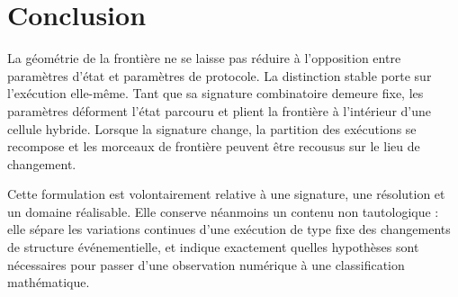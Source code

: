 \section{Conclusion}
\label{annexe-J-conclusion}

La géométrie de la frontière ne se laisse pas réduire à l'opposition
entre paramètres d'état et paramètres de protocole. La distinction
stable porte sur l'exécution elle-même. Tant que sa signature
combinatoire demeure fixe, les paramètres déforment l'état parcouru et
plient la frontière à l'intérieur d'une cellule hybride. Lorsque la
signature change, la partition des exécutions se recompose et les
morceaux de frontière peuvent être recousus sur le lieu de changement.

Cette formulation est volontairement relative à une signature, une
résolution et un domaine réalisable. Elle conserve néanmoins un contenu
non tautologique : elle sépare les variations continues d'une exécution
de type fixe des changements de structure événementielle, et indique
exactement quelles hypothèses sont nécessaires pour passer d'une
observation numérique à une classification mathématique.
